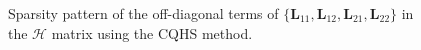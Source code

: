 \begin{figure}

\centering

\begin{subfigure}[b]{0.45\textwidth}

\end{subfigure}

\vspace{-5mm}
\caption{Sparsity pattern of the off-diagonal terms of $\{ \bm{L}_{11}, \bm{L}_{12}, \bm{L}_{21}, \bm{L}_{22} \}$ in the $\bm{\mathcal{H}}$ matrix using the CQHS method.\label{fig:figsparsityCQHS}}
\end{figure}
